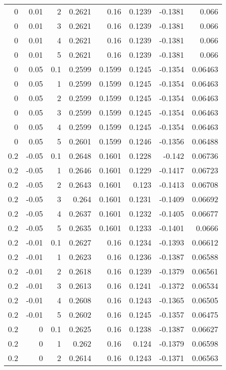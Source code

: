 \documentclass{amsart}
\theoremstyle{plain}
\numberwithin{equation}{section}
\begin{document}
\begin{longtable}{r | r | r | r | r | r | r | r}
0 & 0.01 & 2 & 0.2621 & 0.16 & 0.1239 & -0.1381 & 0.066 \\
0 & 0.01 & 3 & 0.2621 & 0.16 & 0.1239 & -0.1381 & 0.066 \\
0 & 0.01 & 4 & 0.2621 & 0.16 & 0.1239 & -0.1381 & 0.066 \\
0 & 0.01 & 5 & 0.2621 & 0.16 & 0.1239 & -0.1381 & 0.066 \\ \hline
0 & 0.05 & 0.1 & 0.2599 & 0.1599 & 0.1245 & -0.1354 & 0.06463 \\
0 & 0.05 & 1 & 0.2599 & 0.1599 & 0.1245 & -0.1354 & 0.06463 \\
0 & 0.05 & 2 & 0.2599 & 0.1599 & 0.1245 & -0.1354 & 0.06463 \\
0 & 0.05 & 3 & 0.2599 & 0.1599 & 0.1245 & -0.1354 & 0.06463 \\
0 & 0.05 & 4 & 0.2599 & 0.1599 & 0.1245 & -0.1354 & 0.06463 \\
0 & 0.05 & 5 & 0.2601 & 0.1599 & 0.1246 & -0.1356 & 0.06488 \\ \hline
0.2 & -0.05 & 0.1 & 0.2648 & 0.1601 & 0.1228 & -0.142 & 0.06736 \\
0.2 & -0.05 & 1 & 0.2646 & 0.1601 & 0.1229 & -0.1417 & 0.06723 \\
0.2 & -0.05 & 2 & 0.2643 & 0.1601 & 0.123 & -0.1413 & 0.06708 \\
0.2 & -0.05 & 3 & 0.264 & 0.1601 & 0.1231 & -0.1409 & 0.06692 \\
0.2 & -0.05 & 4 & 0.2637 & 0.1601 & 0.1232 & -0.1405 & 0.06677 \\
0.2 & -0.05 & 5 & 0.2635 & 0.1601 & 0.1233 & -0.1401 & 0.0666 \\ \hline
0.2 & -0.01 & 0.1 & 0.2627 & 0.16 & 0.1234 & -0.1393 & 0.06612 \\
0.2 & -0.01 & 1 & 0.2623 & 0.16 & 0.1236 & -0.1387 & 0.06588 \\
0.2 & -0.01 & 2 & 0.2618 & 0.16 & 0.1239 & -0.1379 & 0.06561 \\
0.2 & -0.01 & 3 & 0.2613 & 0.16 & 0.1241 & -0.1372 & 0.06534 \\
0.2 & -0.01 & 4 & 0.2608 & 0.16 & 0.1243 & -0.1365 & 0.06505 \\
0.2 & -0.01 & 5 & 0.2602 & 0.16 & 0.1245 & -0.1357 & 0.06475 \\ \hline
0.2 & 0 & 0.1 & 0.2625 & 0.16 & 0.1238 & -0.1387 & 0.06627 \\
0.2 & 0 & 1 & 0.262 & 0.16 & 0.124 & -0.1379 & 0.06598 \\
0.2 & 0 & 2 & 0.2614 & 0.16 & 0.1243 & -0.1371 & 0.06563 \\

\end{longtable}
\end{document}
